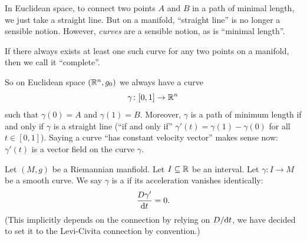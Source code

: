 
\lecture[Geodesics]{}

\begin{node}
In Euclidean space, to connect two points $A$ and $B$ in a path of
minimal length, we just take a straight line. But on a manifold,
``straight line'' is no longer a sensible notion. However,
\emph{curves} are a sensible notion, as is ``minimal length''.

If there always exists
at least one such curve for any two points on a manifold, then we call
it ``complete''.

So on Euclidean space $(\mathbb{R}^{n},g_{0})$ we always have a curve
\begin{equation}
\gamma\colon[0,1]\to\mathbb{R}^{n}
\end{equation}
such that $\gamma(0)=A$ and $\gamma(1)=B$. Moreover, $\gamma$ is a
path of minimum length if and only if $\gamma$ is a straight line
(``if and only if'' $\gamma'(t)=\gamma(1)-\gamma(0)$ for all $t\in[0,1]$).
Saying a curve ``has constant velocity vector'' makes sense now:
$\gamma'(t)$ is a vector field on the curve $\gamma$.
\end{node}

\begin{definition}
Let $(M,g)$ be a Riemannian manfiold. Let $I\subseteq\mathbb{R}$ be an
interval. Let $\gamma\colon I\to M$ be a smooth curve. We say $\gamma$
is a  if its acceleration vanishes identically:
\begin{equation}
\frac{D\gamma'}{\mathrm{d} t}=0.
\end{equation}
(This implicitly depends on the connection by relying on $D/\mathrm{d} t$, we
have decided to set it to the Levi-Civita connection by convention.)
\end{definition}

